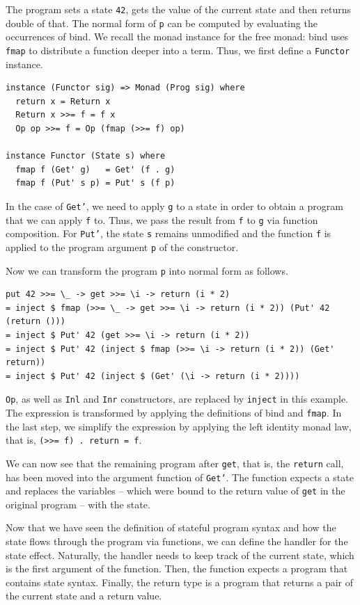 \documentclass[a4paper, 11pt, fleqn, twoside]{scrreprt}
\newcommand{\hinl}[1]{\texttt{#1}}
\begin{document}
The program sets a state \hinl{42}, gets the value of the current state and then returns double of that.
The normal form of \hinl{p} can be computed by evaluating the occurrences of bind.
We recall the monad instance for the free monad: bind uses \hinl{fmap} to distribute a function deeper into a term.
Thus, we first define a \hinl{Functor} instance.

\begin{verbatim}
instance (Functor sig) => Monad (Prog sig) where
  return x = Return x
  Return x >>= f = f x
  Op op >>= f = Op (fmap (>>= f) op)

instance Functor (State s) where
  fmap f (Get' g)   = Get' (f . g)
  fmap f (Put' s p) = Put' s (f p)
\end{verbatim}

In the case of \hinl{Get'}, we need to apply \hinl{g} to a state in order to obtain a program that we can apply \hinl{f} to.
Thus, we pass the result from \hinl{f} to \hinl{g} via function composition.
For \hinl{Put'}, the state \hinl{s} remains unmodified and the function \hinl{f} is applied to the program argument \hinl{p} of the constructor.

Now we can transform the program \hinl{p} into normal form as follows.

\begin{verbatim}
put 42 >>= \_ -> get >>= \i -> return (i * 2)
= inject $ fmap (>>= \_ -> get >>= \i -> return (i * 2)) (Put' 42 (return ()))
= inject $ Put' 42 (get >>= \i -> return (i * 2))
= inject $ Put' 42 (inject $ fmap (>>= \i -> return (i * 2)) (Get' return))
= inject $ Put' 42 (inject $ (Get' (\i -> return (i * 2))))
\end{verbatim}

\hinl{Op}, as well as \hinl{Inl} and \hinl{Inr} constructors, are replaced by \hinl{inject} in this example.
The expression is transformed by applying the definitions of bind and \hinl{fmap}.
In the last step, we simplify the expression by applying the left identity monad law, that is, \hinl{(>>= f) . return = f}.

We can now see that the remaining program after \hinl{get}, that is, the \hinl{return} call, has been moved into the argument function of \hinl{Get'}.
The function expects a state and replaces the variables -- which were bound to the return value of \hinl{get} in the original program -- with the state.

Now that we have seen the definition of stateful program syntax and how the state flows through the program via functions, we can define the handler for the state effect.
Naturally, the handler needs to keep track of the current state, which is the first argument of the function.
Then, the function expects a program that contains state syntax.
Finally, the return type is a program that returns a pair of the current state and a return value.
\end{document}
